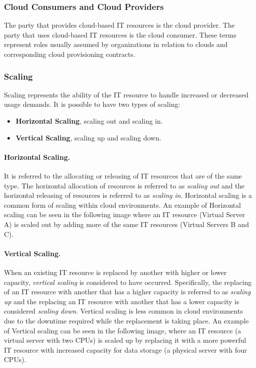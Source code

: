 \subsubsection{Cloud Consumers and Cloud Providers}
The party that provides cloud-based IT resources is the cloud provider. The party that uses cloud-based IT resources is the cloud consumer. These terms represent roles usually assumed by organizations in relation to clouds and corresponding cloud provisioning contracts.

\subsubsection{Scaling}
Scaling represents the ability of the IT resource to handle increased or decreased usage demands. It is possible to have two types of scaling:
\begin{itemize}
	\item \textbf{Horizontal Scaling}, scaling out and scaling in.
	\item \textbf{Vertical Scaling}, scaling up and scaling down.
\end{itemize}

\paragraph*{Horizontal Scaling.} It is referred to the allocating or releasing of IT resources that are of the same type. The horizontal allocation of resources is referred to as \textit{scaling out} and the horizontal releasing of resources is referred to as \textit{scaling in}. Horizontal scaling is a common form of scaling within cloud environments. An example of Horizontal scaling can be seen in the following image where an IT resource (Virtual Server A) is scaled out by adding more of the same IT resources (Virtual Servers B and C). 

\paragraph*{Vertical Scaling.} When an existing IT resource is replaced by another with higher or lower capacity, \textit{vertical scaling} is considered to have occurred. Specifically, the replacing of an IT resource with another that has a higher capacity is referred to as \textit{scaling up} and the replacing an IT resource with another that has a lower capacity is considered \textit{scaling down}. Vertical scaling is less common in cloud environments due to the downtime required while the replacement is taking place. An example of Vertical scaling can be seen in the following image, where an IT resource (a virtual server with two CPUs) is scaled up by replacing it with a more powerful IT resource with increased capacity for data storage (a physical server with four CPUs).

